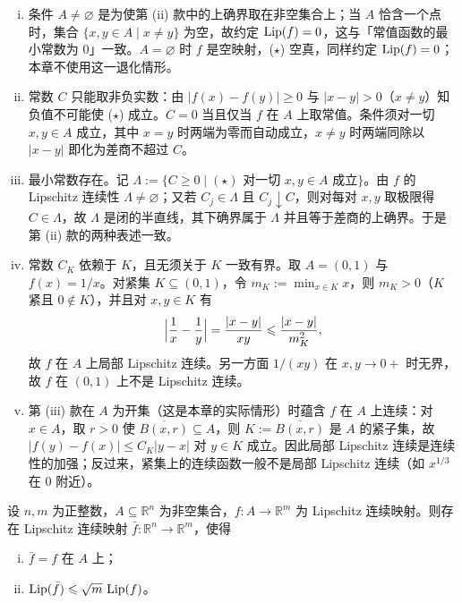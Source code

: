 \documentclass[../../main.tex]{subfiles}%
\begin{document}
\begin{remark}\label{remark:ch03-def-3-1-条件}
\begin{enumerate}[(i)]
\item 条件 $A\neq\varnothing$ 是为使第 (ii) 款中的上确界取在非空集合上；当 $A$ 恰含一个点时，集合 $\{x,y\in A\mid x\neq y\}$ 为空，故约定 $\operatorname{Lip}(f)=0$，这与「常值函数的最小常数为 $0$」一致。$A=\varnothing$ 时 $f$ 是空映射，($\star$) 空真，同样约定 $\operatorname{Lip}(f)=0$；本章不使用这一退化情形。
\item 常数 $C$ 只能取非负实数：由 $\lvert f(x)-f(y)\rvert\geqslant0$ 与 $\lvert x-y\rvert>0$（$x\neq y$）知负值不可能使 ($\star$) 成立。$C=0$ 当且仅当 $f$ 在 $A$ 上取常值。条件须对一切 $x,y\in A$ 成立，其中 $x=y$ 时两端为零而自动成立，$x\neq y$ 时两端同除以 $\lvert x-y\rvert$ 即化为差商不超过 $C$。
\item 最小常数存在。记 $\Lambda:=\{C\geqslant0\mid(\star)\text{ 对一切 }x,y\in A\text{ 成立}\}$。由 $f$ 的 Lipschitz 连续性 $\Lambda\neq\varnothing$；又若 $C_j\in\Lambda$ 且 $C_j\downarrow C$，则对每对 $x,y$ 取极限得 $C\in\Lambda$，故 $\Lambda$ 是闭的半直线，其下确界属于 $\Lambda$ 并且等于差商的上确界。于是第 (ii) 款的两种表述一致。
\item 常数 $C_K$ 依赖于 $K$，且无须关于 $K$ 一致有界。取 $A=(0,1)$ 与 $f(x)=1/x$。对紧集 $K\subseteq(0,1)$，令 $m_K:=\min_{x\in K}x$，则 $m_K>0$（$K$ 紧且 $0\notin K$），并且对 $x,y\in K$ 有
\begin{align*}
\Bigl\lvert\frac1x-\frac1y\Bigr\rvert=\frac{\lvert x-y\rvert}{xy}\leqslant\frac{\lvert x-y\rvert}{m_K^2},
\end{align*}
故 $f$ 在 $A$ 上局部 Lipschitz 连续。另一方面 $1/(xy)$ 在 $x,y\to0+$ 时无界，故 $f$ 在 $(0,1)$ 上不是 Lipschitz 连续。
\item 第 (iii) 款在 $A$ 为开集（这是本章的实际情形）时蕴含 $f$ 在 $A$ 上连续：对 $x\in A$，取 $r>0$ 使 $\overline{B(x,r)}\subseteq A$，则 $K:=\overline{B(x,r)}$ 是 $A$ 的紧子集，故 $\lvert f(y)-f(x)\rvert\leqslant C_K\lvert y-x\rvert$ 对 $y\in K$ 成立。因此局部 Lipschitz 连续是连续性的加强；反过来，紧集上的连续函数一般不是局部 Lipschitz 连续（如 $x^{1/3}$ 在 $0$ 附近）。
\end{enumerate}
\end{remark}

\begin{theorem}\label{theorem:ch03-3-1}
设 $n,m$ 为正整数，$A\subseteq\mathbb{R}^n$ 为非空集合，$f:A\to\mathbb{R}^m$ 为 Lipschitz 连续映射。则存在 Lipschitz 连续映射 $\bar f:\mathbb{R}^n\to\mathbb{R}^m$，使得
\begin{enumerate}[(i)]
\item $\bar f=f$ 在 $A$ 上；
\item $\operatorname{Lip}(\bar f)\leqslant\sqrt{m}\,\operatorname{Lip}(f)$。
\end{enumerate}
\end{theorem}
\end{document}
